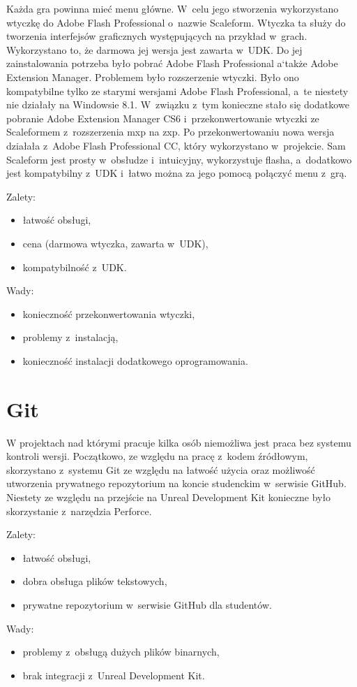 Każda gra powinna mieć menu główne. W~celu jego stworzenia wykorzystano wtyczkę do Adobe Flash Professional o~nazwie Scaleform. Wtyczka ta służy do tworzenia interfejsów graficznych występujących na przykład w~grach. Wykorzystano to, że darmowa jej wersja jest zawarta w~UDK. Do jej zainstalowania potrzeba było pobrać Adobe Flash Professional a`także Adobe Extension Manager. Problemem było rozszerzenie wtyczki. Było ono kompatybilne tylko ze starymi wersjami Adobe Flash Professional, a~te niestety nie działały na Windowsie 8.1. W~związku z~tym konieczne stało się dodatkowe pobranie 
Adobe Extension Manager CS6 i~przekonwertowanie wtyczki ze Scaleformem z~rozszerzenia mxp na zxp.
Po przekonwertowaniu nowa wersja działała z~Adobe Flash Professional CC, który wykorzystano w~projekcie. Sam Scaleform jest prosty w~obsłudze i~intuicyjny, wykorzystuje flasha, a~dodatkowo jest kompatybilny z~UDK i~łatwo można za jego pomocą połączyć menu z~grą.

{\raggedright Zalety:
\begin{itemize}
\item łatwość obsługi,
\item cena (darmowa wtyczka, zawarta w~UDK),
\item kompatybilność z~UDK.
\end{itemize}

Wady:
\begin{itemize}
\item konieczność przekonwertowania wtyczki,
\item problemy z~instalacją,
\item konieczność instalacji dodatkowego oprogramowania.
\end{itemize}
}

\section{Git}

W projektach nad którymi pracuje kilka osób niemożliwa jest praca bez systemu kontroli wersji. Początkowo, ze względu na pracę z~kodem źródłowym, skorzystano z~systemu Git ze względu na łatwość użycia oraz możliwość utworzenia prywatnego repozytorium na koncie studenckim w~serwisie GitHub. Niestety ze względu na przejście na Unreal Development Kit konieczne było skorzystanie z~narzędzia Perforce.\\

{\raggedright Zalety:
\begin{itemize}
\item łatwość obsługi,
\item dobra obsługa plików tekstowych,
\item prywatne repozytorium w~serwisie GitHub dla studentów.
\end{itemize}

Wady:
\begin{itemize}
\item problemy z~obsługą dużych plików binarnych,
\item brak integracji z~Unreal Development Kit.
\end{itemize}
}


